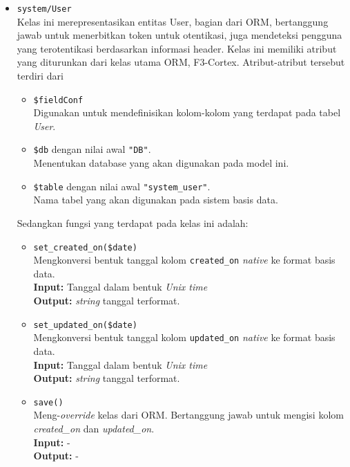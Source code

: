 \begin{itemize}
        \item \texttt{system/User} \\
            Kelas ini merepresentasikan entitas User, bagian dari ORM, bertanggung jawab
            untuk menerbitkan token untuk otentikasi, juga mendeteksi pengguna yang terotentikasi
            berdasarkan informasi header.
            Kelas ini memiliki atribut yang diturunkan dari kelas utama ORM, F3-Cortex.
            Atribut-atribut tersebut terdiri dari
            \begin{itemize}
                \item \texttt{\$fieldConf}\\
                    Digunakan untuk mendefinisikan kolom-kolom yang terdapat pada tabel \textit{User}.
                \item \texttt{\$db} dengan nilai awal \texttt{"DB"}. \\
                    Menentukan database yang akan digunakan pada model ini.
                \item \texttt{\$table} dengan nilai awal \texttt{"system\_user"}. \\
                    Nama tabel yang akan digunakan pada sistem basis data. 
            \end{itemize}
            Sedangkan fungsi yang terdapat pada kelas ini adalah:
            \begin{itemize}
                \item \texttt{set\_created\_on(\$date)} \\
                    Mengkonversi bentuk tanggal kolom \texttt{created\_on} \textit{native} ke 
                    format basis data. \\
                    \textbf{Input:} Tanggal dalam bentuk \textit{Unix time}\\
                    \textbf{Output:} \textit{string} tanggal terformat.
                
                \item \texttt{set\_updated\_on(\$date)} \\
                    Mengkonversi bentuk tanggal kolom \texttt{updated\_on} \textit{native} ke 
                    format basis data. \\
                    \textbf{Input:} Tanggal dalam bentuk \textit{Unix time}\\
                    \textbf{Output:} \textit{string} tanggal terformat.
                
                \item \texttt{save()} \\
                    Meng-\textit{override} kelas dari ORM. Bertanggung jawab untuk mengisi
                    kolom \textit{created\_on} dan \textit{updated\_on}.\\
                    \textbf{Input:} -\\
                    \textbf{Output:} -
                

\end{itemize}
\end{itemize}
